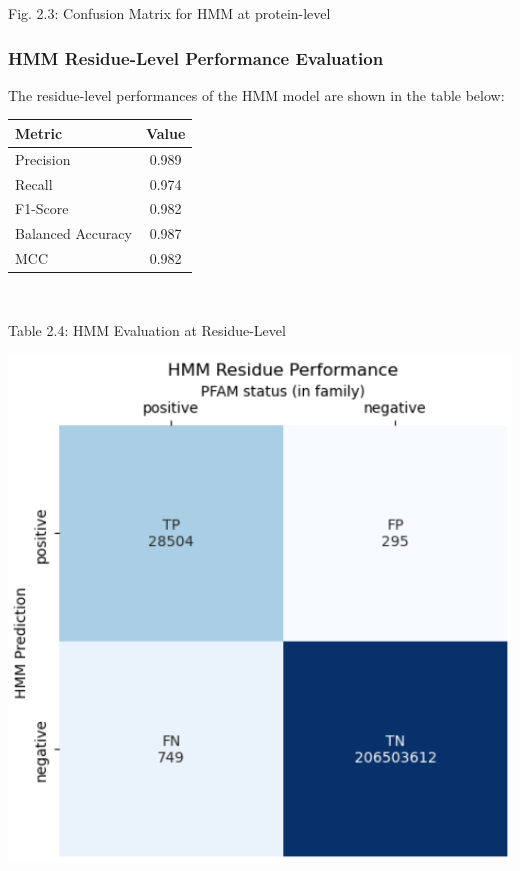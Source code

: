 \documentclass[10pt,twocolumn,letterpaper]{article}
\begin{document}
\begin{center}
    \small{Fig. 2.3: Confusion Matrix for HMM at protein-level}
\end{center}

\subsubsection{HMM Residue-Level Performance Evaluation}

The residue-level performances of the HMM model are shown in the table below:

\begin{center}
    \begin{tabular}{lc}
        \toprule
        Metric & Value \\
        \midrule
        Precision & 0.989 \\
        Recall & 0.974 \\
        F1-Score & 0.982 \\
        Balanced Accuracy & 0.987 \\
        MCC & 0.982 \\
        \bottomrule
    \end{tabular}
\end{center} \\

\begin{center}
    \small{Table 2.4: HMM Evaluation at Residue-Level}
\end{center}

\begin{center}
    \includegraphics[scale=0.45]{report/img/hmm_res_performance.png}
\end{center}
\end{document}
